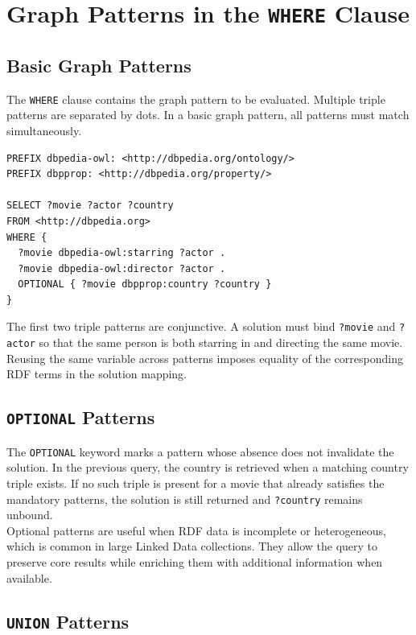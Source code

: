 \documentclass{scrbook}
\begin{document}
	\section{Graph Patterns in the \texttt{WHERE} Clause}
	
	\subsection{Basic Graph Patterns}
	
	The \texttt{WHERE} clause contains the graph pattern to be evaluated. Multiple triple patterns are separated by dots. In a basic graph pattern, all patterns must match simultaneously.
	
	\begin{lstlisting}
PREFIX dbpedia-owl: <http://dbpedia.org/ontology/>
PREFIX dbpprop: <http://dbpedia.org/property/>

SELECT ?movie ?actor ?country
FROM <http://dbpedia.org>
WHERE {
  ?movie dbpedia-owl:starring ?actor .
  ?movie dbpedia-owl:director ?actor .
  OPTIONAL { ?movie dbpprop:country ?country }
}
	\end{lstlisting}
	
	The first two triple patterns are conjunctive. A solution must bind \texttt{?movie} and \texttt{?actor} so that the same person is both starring in and directing the same movie. Reusing the same variable across patterns imposes equality of the corresponding RDF terms in the solution mapping.
	
	\subsection{\texttt{OPTIONAL} Patterns}
	
	The \texttt{OPTIONAL} keyword marks a pattern whose absence does not invalidate the solution. In the previous query, the country is retrieved when a matching country triple exists. If no such triple is present for a movie that already satisfies the mandatory patterns, the solution is still returned and \texttt{?country} remains unbound.\\
	
	Optional patterns are useful when RDF data is incomplete or heterogeneous, which is common in large Linked Data collections. They allow the query to preserve core results while enriching them with additional information when available.
	
	\subsection{\texttt{UNION} Patterns}
	
\end{document}
